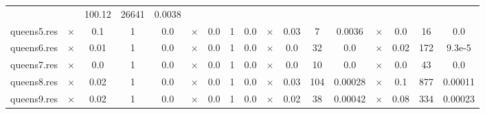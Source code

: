 \documentclass[main.tex]{subfiles}
\begin{document}
\begin{landscape}
\begin{center}
\begin{tabular}{|l|cccc|cccc|cccc|cccc|}
 &  & 100.12 & 26641 & 0.0038
\\
queens5.res & $\times$ & 0.1 & 1 & 0.0
 & $\times$ & 0.0 & 1 & 0.0
 & $\times$ & 0.03 & 7 & 0.0036
 & $\times$ & 0.0 & 16 & 0.0
\\
queens6.res & $\times$ & 0.01 & 1 & 0.0
 & $\times$ & 0.0 & 1 & 0.0
 & $\times$ & 0.0 & 32 & 0.0
 & $\times$ & 0.02 & 172 & 9.3e-5
\\
queens7.res & $\times$ & 0.0 & 1 & 0.0
 & $\times$ & 0.0 & 1 & 0.0
 & $\times$ & 0.0 & 10 & 0.0
 & $\times$ & 0.0 & 43 & 0.0
\\
queens8.res & $\times$ & 0.02 & 1 & 0.0
 & $\times$ & 0.0 & 1 & 0.0
 & $\times$ & 0.03 & 104 & 0.00028
 & $\times$ & 0.1 & 877 & 0.00011
\\
queens9.res & $\times$ & 0.02 & 1 & 0.0
 & $\times$ & 0.0 & 1 & 0.0
 & $\times$ & 0.02 & 38 & 0.00042
 & $\times$ & 0.08 & 334 & 0.00023
\\
\hline\end{tabular}
\end{center}
\end{landscape}
\end{document}
